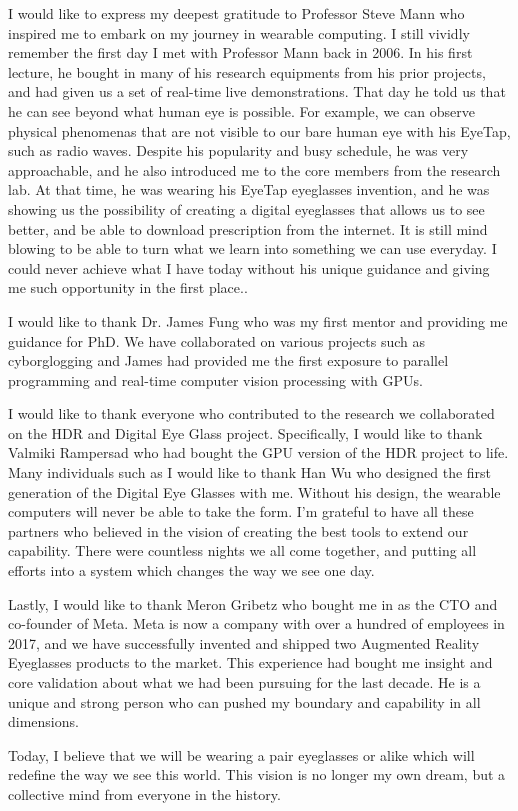 I would like to express my deepest gratitude to Professor Steve Mann who inspired me to embark on my journey in wearable computing. I still vividly remember the first day I met with Professor Mann back in 2006. In his first lecture, he bought in many of his research equipments from his prior projects, and had given us a set of real-time live demonstrations. That day he told us that he can see beyond what human eye is possible. For example, we can observe physical phenomenas that are not visible to our bare human eye with his EyeTap, such as radio waves. Despite his popularity and busy schedule, he was very approachable, and he also introduced me to the core members from the research lab. At that time, he was wearing his EyeTap eyeglasses invention, and he was showing us the possibility of creating a digital eyeglasses that allows us to see better, and be able to download prescription from the internet. It is still mind blowing to be able to turn what we learn into something we can use everyday. I could never achieve what I have today without his unique guidance and giving me such opportunity in the first place.. 

I would like to thank Dr. James Fung who was my first mentor and providing me guidance for PhD. We have collaborated on various projects such as cyborglogging and James had provided me the first exposure to parallel programming and real-time computer vision processing with GPUs. 

I would like to thank everyone who contributed to the research we collaborated on the HDR and Digital Eye Glass project. Specifically, I would like to thank Valmiki Rampersad who had bought the GPU version of the HDR project to life. Many individuals such as  I would like to thank Han Wu who designed the first generation of the Digital Eye Glasses with me. Without his design, the wearable computers will never be able to take the form. I'm grateful to have all these partners who believed in the vision of creating the best tools to extend our capability. There were countless nights we all come together, and putting all efforts into a system which changes the way we see one day.
 
Lastly, I would like to thank Meron Gribetz who bought me in as the CTO and co-founder of Meta. Meta is now a company with over a hundred of employees in 2017, and we have successfully invented and shipped two Augmented Reality Eyeglasses products to the market. This experience had bought me insight and core validation about what we had been pursuing for the last decade. He is a unique and strong person who can pushed my boundary and capability in all dimensions.

Today, I believe that we will be wearing a pair eyeglasses or alike which will redefine the way we see this world. This vision is no longer my own dream, but a collective mind from everyone in the history.